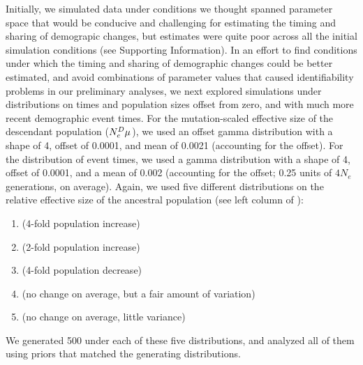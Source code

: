 Initially, we simulated data under conditions we thought spanned parameter
space that would be conducive and challenging for estimating the timing and
sharing of demograpic changes, but estimates were quite poor across all the
initial simulation conditions (see Supporting Information).
In an effort to find conditions under which the timing and sharing of
demographic changes could be better estimated, and avoid combinations of
parameter values that caused identifiability problems in our preliminary
analyses,
we next explored simulations under distributions on times and population sizes
offset from zero, and with much more recent demographic event times.
For the mutation-scaled effective size of the descendant
population
($\epopsize[\descendantpopindex{}]\murate$),
we used an offset gamma distribution with a shape of 4, offset of 0.0001, and
mean of 0.0021 (accounting for the offset).
For the distribution of event times, we used a gamma distribution
with a shape of 4, offset of 0.0001, and a mean of 0.002 (accounting
for the offset; 0.25 units of $4N_e$ generations, on average).
Again, we used five different distributions on the relative effective size of
the ancestral population (see left column of
\figs
{}):
\begin{enumerate}[label=B.\arabic*]
    \item {} (4-fold population increase) \label{sims:optimalFourFoldIncrease}
    \item {} (2-fold population increase)  \label{sims:optimalTwoFoldIncrease}
    \item {} (4-fold population decrease)    \label{sims:optimalFourFoldDecrease}
    \item {} (no change on average, but a fair amount of variation) \label{sims:optimalCenter}
    \item {} (no change on average, little variance) \label{sims:optimalCenterNarrow}
\end{enumerate}
We generated 500 \datasets under each of these five distributions, and analyzed
all of them using priors that matched the generating distributions.

